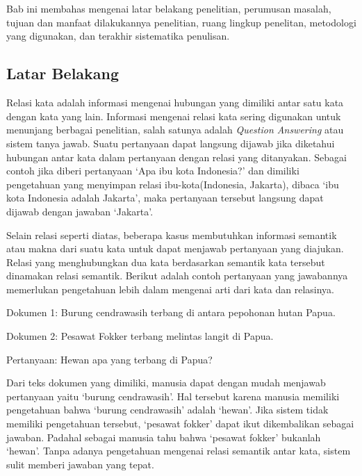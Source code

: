 \chapter{\babSatu}
Bab ini membahas mengenai latar belakang penelitian, perumusan masalah, tujuan dan manfaat dilakukannya penelitian, ruang lingkup penelitan, metodologi yang digunakan, dan terakhir sistematika penulisan. 

%
\section{Latar Belakang}
Relasi kata adalah informasi mengenai hubungan yang dimiliki antar satu kata dengan kata yang lain. Informasi mengenai relasi kata sering digunakan untuk menunjang berbagai penelitian, salah satunya adalah \textit{Question Answering} atau sistem tanya jawab. Suatu pertanyaan dapat langsung dijawab jika diketahui hubungan antar kata dalam pertanyaan dengan relasi yang ditanyakan. Sebagai contoh jika diberi pertanyaan `Apa ibu kota Indonesia?' dan dimiliki pengetahuan yang menyimpan relasi ibu-kota(Indonesia, Jakarta), dibaca `ibu kota Indonesia adalah Jakarta', maka pertanyaan tersebut langsung dapat dijawab dengan jawaban `Jakarta'.

Selain relasi seperti diatas, beberapa kasus membutuhkan informasi semantik atau makna dari suatu kata untuk dapat menjawab pertanyaan yang diajukan. Relasi yang menghubungkan dua kata berdasarkan semantik kata tersebut dinamakan relasi semantik. Berikut adalah contoh pertanyaan yang jawabannya memerlukan pengetahuan lebih dalam mengenai arti dari kata dan relasinya.

Dokumen 1: Burung cendrawasih terbang di antara pepohonan hutan Papua.

Dokumen 2: Pesawat Fokker terbang melintas langit di Papua.

Pertanyaan: Hewan apa yang terbang di Papua?

\noindent Dari teks dokumen yang dimiliki, manusia dapat dengan mudah menjawab pertanyaan yaitu `burung cendrawasih'. Hal tersebut karena manusia memiliki pengetahuan bahwa `burung cendrawasih' adalah `hewan'. Jika sistem tidak memiliki pengetahuan tersebut, `pesawat fokker' dapat ikut dikembalikan sebagai jawaban. Padahal sebagai manusia tahu bahwa `pesawat fokker' bukanlah `hewan'. Tanpa adanya pengetahuan mengenai relasi semantik antar kata, sistem sulit memberi jawaban yang tepat.


